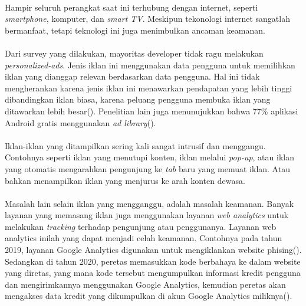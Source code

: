 \documentclass[./bab_1.tex]{subfiles}
\begin{document}
  \paragraph*{} Hampir seluruh perangkat saat ini terhubung
  dengan internet, seperti \textit{smartphone}, komputer,
  dan \textit{smart TV}. Meskipun tekonologi internet
  sangatlah bermanfaat, tetapi teknologi ini juga
  menimbulkan ancaman keamanan.

  \paragraph*{} Dari survey yang dilakukan, mayoritas
  developer tidak ragu melakukan \textit{personalized-ads}.
  Jenis iklan ini menggunakan data pengguna untuk memilihkan
  iklan yang dianggap relevan berdasarkan data pengguna. Hal
  ini tidak mengherankan karena jenis iklan ini menawarkan
  pendapatan yang lebih tinggi dibandingkan iklan biasa,
  karena peluang pengguna membuka iklan yang ditawarkan
  lebih besar(\cite{tahaei2021}). Penelitian lain juga
  menunujukkan bahwa 77\% aplikasi Android gratis
  menggunakan \textit{ad library}(\cite{he2018, jin2021}).

  \paragraph*{} Iklan-iklan yang ditampilkan sering kali
  sangat intrusif dan menggangu. Contohnya seperti iklan
  yang menutupi konten, iklan melalui \textit{pop-up}, atau
  iklan yang otomatis mengarahkan pengunjung ke \textit{tab}
  baru yang memuat iklan. Atau bahkan menampilkan iklan
  yang menjurus ke arah konten dewasa.

  \paragraph*{} Masalah lain selain iklan yang mengganggu,
  adalah masalah keamanan. Banyak layanan yang memasang
  iklan juga menggunakan layanan \textit{web analytics}
  untuk melakukan \textit{tracking} terhadap pengunjung atau
  penggunanya. Layanan web analytics inilah yang dapat
  menjadi celah keamanan. Contohnya pada tahun 2019, layanan
  Google Analytics digunakan untuk mengiklankan website
  phising(\cite{charlie2019}). Sedangkan di tahun 2020,
  peretas memasukkan kode berbahaya ke dalam website yang
  diretas, yang mana kode tersebut mengumpulkan informasi
  kredit pengguna dan mengirimkannya menggunakan Google
  Analytics, kemudian peretas akan mengakses data kredit
  yang dikumpulkan di akun Google Analytics
  miliknya(\cite{ravie2020}).
\end{document}
